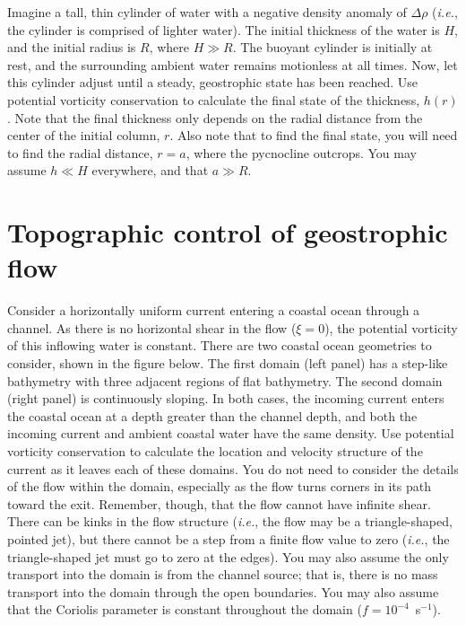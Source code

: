 \documentclass[11pt]{report}
\numberwithin{equation}{section}
\begin{document}
Imagine a tall, thin cylinder of water with a negative density anomaly of $\Delta\rho$ (\emph{i.e.}, the cylinder is comprised of lighter water).  The initial thickness of the water is $H$, and the initial radius is $R$, where $H\gg{}R$.  The buoyant cylinder is initially at rest, and the surrounding ambient water remains motionless at all times.  Now, let this cylinder adjust until a steady, geostrophic state has been reached.  Use potential vorticity conservation to calculate the final state of the thickness, $h(r)$.  Note that the final thickness only depends on the radial distance from the center of the initial column, $r$.  Also note that to find the final state, you will need to find the radial distance, $r=a$, where the pycnocline outcrops.  You may assume $h\ll{}H$ everywhere, and that $a\gg{}R$.

\clearpage
\section{Topographic control of geostrophic flow}
\label{prob:topo_geostrophic_flow}

Consider a horizontally uniform current entering a coastal ocean through a channel.  As there is no horizontal shear in the flow ($\xi = 0$), the potential vorticity of this inflowing water is constant.  There are two coastal ocean geometries to consider, shown in the figure below.  The first domain (left panel) has a step-like bathymetry with three adjacent regions of flat bathymetry.  The second domain (right panel) is continuously sloping.  In both cases, the incoming current enters the coastal ocean at a depth greater than the channel depth, and both the incoming current and ambient coastal water have the same density.  Use potential vorticity conservation to calculate the location and velocity structure of the current as it leaves each of these domains.  You do not need to consider the details of the flow within the domain, especially as the flow turns corners in its path toward the exit.  Remember, though, that the flow cannot have infinite shear.  There can be kinks in the flow structure (\emph{i.e.}, the flow may be a triangle-shaped, pointed jet), but there cannot be a step from a finite flow value to zero (\emph{i.e.}, the triangle-shaped jet must go to zero at the edges).  You may also assume the only transport into the domain is from the channel source; that is, there is no mass transport into the domain through the open boundaries.  You may also assume that the Coriolis parameter is constant throughout the domain ($f=10^{-4}$~s$^{-1}$).
\end{document}

